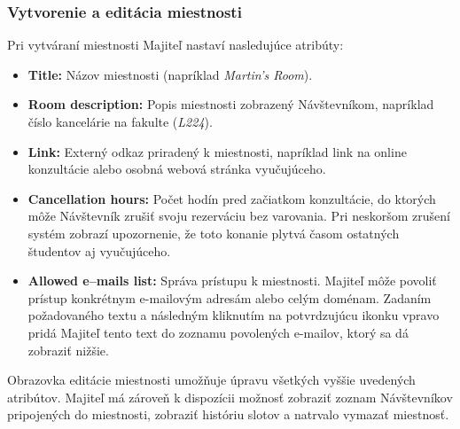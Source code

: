 \subsubsection*{Vytvorenie a editácia miestnosti}
Pri vytváraní miestnosti Majiteľ nastaví nasledujúce atribúty:
\begin{itemize}
    \item \textbf{Title:} Názov miestnosti (napríklad \textit{Martin's Room}).
    \item \textbf{Room description:} Popis miestnosti zobrazený Návštevníkom, napríklad číslo kancelárie na fakulte (\textit{L224}).
    \item \textbf{Link:} Externý odkaz priradený k miestnosti, napríklad link na online konzultácie alebo osobná webová stránka vyučujúceho.
    \item \textbf{Cancellation hours:} Počet hodín pred začiatkom konzultácie, do ktorých môže Návštevník zrušiť svoju rezerváciu bez varovania. Pri neskoršom zrušení systém zobrazí upozornenie, že toto konanie plytvá časom ostatných študentov aj vyučujúceho.
    \item \textbf{Allowed e–mails list:} Správa prístupu k miestnosti. Majiteľ môže povoliť prístup konkrétnym e-mailovým adresám alebo celým doménam. Zadaním požadovaného textu a následným kliknutím na potvrdzujúcu ikonku vpravo pridá Majiteľ tento text do zoznamu povolených e-mailov, ktorý sa dá zobraziť nižšie.
\end{itemize}
Obrazovka editácie miestnosti umožňuje úpravu všetkých vyššie uvedených atribútov. Majiteľ má zároveň k dispozícii možnosť zobraziť zoznam Návštevníkov pripojených do miestnosti, zobraziť históriu slotov a natrvalo vymazať miestnosť.

